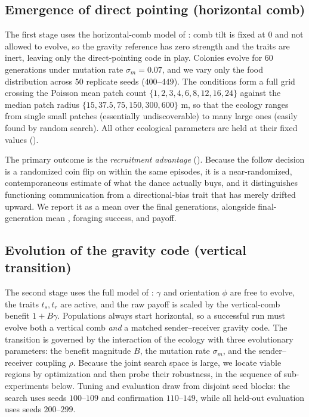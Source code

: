 \subsection{Emergence of direct pointing (horizontal comb)}
\label{sec:setup-horizontal}
The first stage uses the horizontal-comb model of : comb
tilt is fixed at $0$ and not allowed to evolve, so the gravity reference has zero
strength and the  traits are inert, leaving only the direct-pointing
code in play. Colonies evolve for $60$ generations under mutation rate
$\sigma_m = 0.07$, and we vary only the food distribution across $50$ replicate
seeds ($400$--$449$). The conditions form a full grid crossing the Poisson mean
patch count $\{1,2,3,4,6,8,12,16,24\}$ against the median patch radius
$\{15, 37.5, 75, 150, 300, 600\}$ m, so that the ecology ranges from single small
patches (essentially undiscoverable) to many large ones (easily found by random
search). All other ecological parameters are held at their fixed values
().

The primary outcome is the \emph{recruitment advantage} ().
Because the follow decision is a randomized coin flip on  within
the same episodes, it is a near-randomized, contemporaneous estimate of what the
dance actually buys, and it distinguishes functioning communication from a
directional-bias trait that has merely drifted upward. We report it as a mean over
the final generations, alongside final-generation mean , foraging
success, and payoff.

\subsection{Evolution of the gravity code (vertical transition)}
\label{sec:setup-transition}
The second stage uses the full model of :  $\gamma$
and orientation $\phi$ are free to evolve, the  traits $t_s, t_r$ are
active, and the raw payoff is scaled by the vertical-comb benefit
$1 + B\gamma$. Populations always start horizontal, so a successful run must
evolve both a vertical comb \emph{and} a matched sender--receiver gravity code.
The transition is governed by the interaction of the ecology with three
evolutionary parameters: the benefit magnitude $B$, the mutation rate
$\sigma_m$, and the sender--receiver coupling $\rho$. Because the joint search
space is large, we locate viable regions by optimization and then probe their
robustness, in the sequence of sub-experiments below. Tuning and evaluation draw
from disjoint seed blocks: the search uses seeds $100$--$109$ and confirmation
$110$--$149$, while all held-out evaluation uses seeds $200$--$299$.

